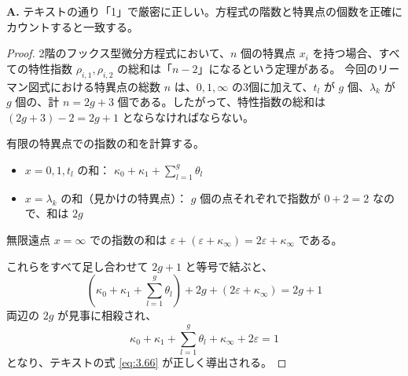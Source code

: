 \begin{Q}
\textbf{A.} テキストの通り「1」で厳密に正しい。方程式の階数と特異点の個数を正確にカウントすると一致する。

\begin{proof}
2階のフックス型微分方程式において、$n$ 個の特異点 $x_i$ を持つ場合、すべての特性指数 $\rho_{i, 1}, \rho_{i, 2}$ の総和は「$n-2$」になるという定理がある。
今回のリーマン図式における特異点の総数 $n$ は、$0, 1, \infty$ の3個に加えて、$t_l$ が $g$ 個、$\lambda_k$ が $g$ 個の、計 $n = 2g + 3$ 個である。したがって、特性指数の総和は $(2g+3) - 2 = 2g+1$ とならなければならない。

有限の特異点での指数の和を計算する。
\begin{itemize}
    \item $x=0, 1, t_l$ の和： $\kappa_0 + \kappa_1 + \sum_{l=1}^g \theta_l$
    \item $x=\lambda_k$ の和（見かけの特異点）： $g$ 個の点それぞれで指数が $0+2=2$ なので、和は $2g$
\end{itemize}
無限遠点 $x=\infty$ での指数の和は $\varepsilon + (\varepsilon+\kappa_\infty) = 2\varepsilon + \kappa_\infty$ である。

これらをすべて足し合わせて $2g+1$ と等号で結ぶと、
\begin{equation*}
\left( \kappa_0 + \kappa_1 + \sum_{l=1}^g \theta_l \right) + 2g + \left( 2\varepsilon + \kappa_\infty \right) = 2g + 1
\end{equation*}
両辺の $2g$ が見事に相殺され、
\begin{equation*}
\kappa_0 + \kappa_1 + \sum_{l=1}^g \theta_l + \kappa_\infty + 2\varepsilon = 1
\end{equation*}
となり、テキストの式 \eqref{eq:3.66} が正しく導出される。
\end{proof}
\end{Q}


